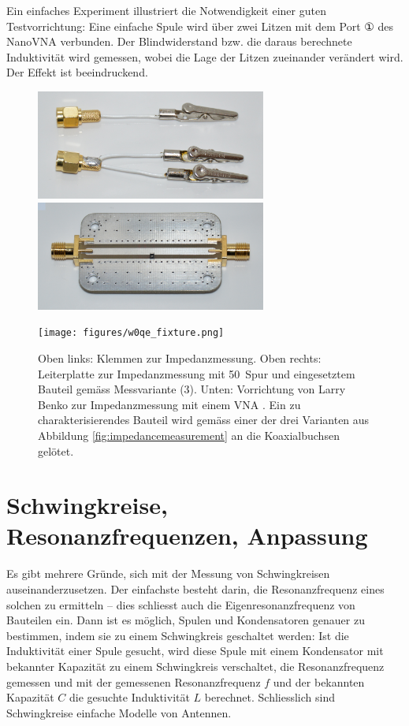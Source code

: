 \documentclass[twoside,a4paper,11pt,halfparskip,DIV=11,notitlepage]{scrartcl}
\begin{document}
Ein einfaches Experiment illustriert die Notwendigkeit einer guten
Testvorrichtung: Eine einfache Spule wird über zwei Litzen mit dem Port ①  des
NanoVNA verbunden. Der Blindwiderstand bzw. die daraus berechnete Induktivität
wird gemessen, wobei die Lage der Litzen zueinander verändert wird. Der Effekt
ist beeindruckend. 

\begin{figure}\begin{center}
    \includegraphics[height=36mm]{figures/klemmen.jpg}\hfill
    \includegraphics[height=36mm]{figures/impedanzpcb.jpg}

    \texttt{[image: figures/w0qe\_fixture.png]}
    \caption{Oben links: Klemmen zur Impedanzmessung. Oben rechts: Leiterplatte zur Impedanzmessung
        mit 50~\Ohm Spur und eingesetztem Bauteil gemäss Messvariante (3). Unten: Vorrichtung von Larry Benko zur Impedanzmessung mit einem VNA \cite{benko2020impedance}.
    Ein zu charakterisierendes Bauteil wird gemäss einer der drei Varianten aus Abbildung \ref{fig:impedancemeasurement}
    an die Koaxialbuchsen gelötet.}
    \label{fig:testfixtures}
\end{center}\end{figure}

\newpage %
\section{Schwingkreise, Resonanzfrequenzen, Anpassung}\label{sec:schwingkreis}
Es gibt mehrere Gründe, sich mit der Messung von Schwingkreisen
auseinanderzusetzen. Der einfachste besteht darin, die Resonanzfrequenz
eines solchen zu ermitteln -- dies schliesst auch die Eigenresonanzfrequenz von
Bauteilen ein. Dann ist es möglich, Spulen und Kondensatoren genauer zu
bestimmen, indem sie zu einem Schwingkreis geschaltet werden: Ist die
Induktivität einer Spule gesucht, wird diese Spule mit einem Kondensator
mit bekannter Kapazität zu einem Schwingkreis verschaltet, die Resonanzfrequenz
gemessen und mit der gemessenen Resonanzfrequenz $f$ und der bekannten
Kapazität $C$ die gesuchte Induktivität $L$ berechnet. Schliesslich sind
Schwingkreise einfache Modelle von Antennen.
\end{document}
